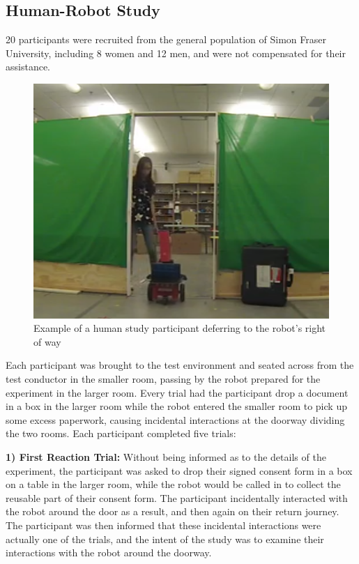 \documentclass[letterpaper, 10 pt, conference]{ieeeconf}  %
\begin{document}
\subsection{Human-Robot Study}

20 participants were recruited from the general population of Simon Fraser University, including 8 women and 12 men, and were not compensated for their assistance.

     \begin{figure}
      \centering
      \includegraphics[scale=0.5]{test_example.png}
      \caption{Example of a human study participant deferring to the robot's right of way}
      \label{fig:Example}
   \end{figure}

Each participant was brought to the test environment and seated across from the test conductor in the smaller room, passing by the robot prepared for the experiment in the larger room. Every trial had the participant drop a document in a box in the larger room while the robot entered the smaller room to pick up some excess paperwork, causing incidental interactions at the doorway dividing the two rooms. Each participant completed five trials:

\textbf{1) First Reaction Trial:} Without being informed as to the details of the experiment, the participant was asked to drop their signed consent form in a box on a table in the larger room, while the robot would be called in to collect the reusable part of their consent form. The participant incidentally interacted with the robot around the door as a result, and then again on their return journey. The participant was then informed that these incidental interactions were actually one of the trials, and the intent of the study was to examine their interactions with the robot around the doorway.
\end{document}
